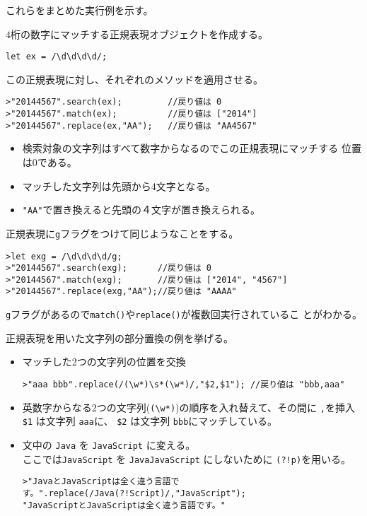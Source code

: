 これらをまとめた実行例を示す。
\begin{Exec}\upshape
$4$桁の数字にマッチする正規表現オブジェクトを作成する。
\begin{Verbatim}
let ex = /\d\d\d\d/;
\end{Verbatim}
この正規表現に対し、それぞれのメソッドを適用させる。
\begin{Verbatim}
>"20144567".search(ex);         //戻り値は 0
>"20144567".match(ex);          //戻り値は ["2014"]
>"20144567".replace(ex,"AA");   //戻り値は "AA4567"
\end{Verbatim}
\begin{itemize}
 \item 検索対象の文字列はすべて数字からなるのでこの正規表現にマッチする
       位置は$0$である。
 \item マッチした文字列は先頭から4文字となる。
 \item \Verb+"AA"+で置き換えると先頭の４文字が置き換えられる。
\end{itemize}
正規表現に\Verb+g+フラグをつけて同じようなことをする。
\begin{Verbatim}
>let exg = /\d\d\d\d/g;
>"20144567".search(exg);      //戻り値は 0
>"20144567".match(exg);       //戻り値は ["2014", "4567"]
>"20144567".replace(exg,"AA");//戻り値は "AAAA"
\end{Verbatim}
\Verb+g+フラグがあるので\Verb+match()+や\Verb+replace()+が複数回実行されているこ
 とがわかる。
\end{Exec}
\begin{Exec}\upshape
正規表現を用いた文字列の部分置換の例を挙げる。
\begin{itemize}
 \item マッチした2つの文字列の位置を交換
\begin{Verbatim}
>"aaa bbb".replace(/(\w*)\s*(\w*)/,"$2,$1"); //戻り値は "bbb,aaa"
\end{Verbatim}
 \item 英数字からなる2つの文字列(\Verb+(\w*)+)の順序を入れ替えて、その間に
 \Verb+,+を挿入\\
\Verb+$1+ は文字列 \Verb+aaa+に、
\Verb+$2+ は文字列 \Verb+bbb+にマッチしている。
 \item 文中の \Verb+Java+ を \Verb+JavaScript+ に変える。\\
ここでは\Verb+JavaScript+ を \Verb+JavaJavaScript+ にしないために
\Verb+(?!p)+を用いる。
\begin{Verbatim}
>"JavaとJavaScriptは全く違う言語です。".replace(/Java(?!Script)/,"JavaScript");
"JavaScriptとJavaScriptは全く違う言語です。"
\end{Verbatim}
\end{itemize}
\end{Exec}
